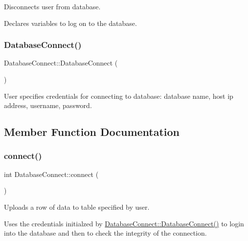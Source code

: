 Disconnects user from database. 

Declares variables to log on to the database. \mbox{\label{classDatabaseConnect_a5f6ea02e82b1b8463d8c8053ef811e1f}} 
\subsubsection{\texorpdfstring{Database\+Connect()}{DatabaseConnect()}\hspace{0.1cm}{\footnotesize\ttfamily [2/2]}}
{\footnotesize\ttfamily Database\+Connect\+::\+Database\+Connect (\begin{DoxyParamCaption}{ }\end{DoxyParamCaption})}



User specifies credentials for connecting to database\+: database name, host ip address, username, password. 



\subsection{Member Function Documentation}
\mbox{\label{classDatabaseConnect_a9e0c28f4d98a60273eecaac77a596878}} 
\subsubsection{\texorpdfstring{connect()}{connect()}}
{\footnotesize\ttfamily int Database\+Connect\+::connect (\begin{DoxyParamCaption}{ }\end{DoxyParamCaption})}



Uploads a row of data to table specified by user. 

Uses the credentials initialzed by \mbox{\hyperlink{classDatabaseConnect_a5f6ea02e82b1b8463d8c8053ef811e1f}{Database\+Connect\+::\+Database\+Connect()}} to login into the database and then to check the integrity of the connection. \mbox{\label{classDatabaseConnect_a252260a2134ff437ce2b84480a5632a0}} 
